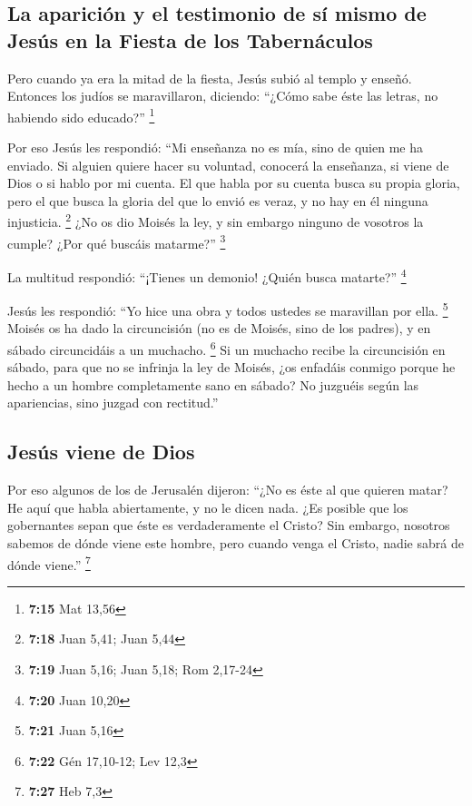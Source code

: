 \hypertarget{la-apariciuxf3n-y-el-testimonio-de-suxed-mismo-de-jesuxfas-en-la-fiesta-de-los-tabernuxe1culos}{%
\subsection{La aparición y el testimonio de sí mismo de Jesús en la
Fiesta de los
Tabernáculos}\label{la-apariciuxf3n-y-el-testimonio-de-suxed-mismo-de-jesuxfas-en-la-fiesta-de-los-tabernuxe1culos}}

 Pero cuando ya era la mitad de la fiesta, Jesús subió al
templo y enseñó.  Entonces los judíos se maravillaron,
diciendo: ``¿Cómo sabe éste las letras, no habiendo sido educado?''
\footnote{\textbf{7:15} Mat 13,56}

 Por eso Jesús les respondió: ``Mi enseñanza no es mía,
sino de quien me ha enviado.  Si alguien quiere hacer su
voluntad, conocerá la enseñanza, si viene de Dios o si hablo por mi
cuenta.  El que habla por su cuenta busca su propia
gloria, pero el que busca la gloria del que lo envió es veraz, y no hay
en él ninguna injusticia. \footnote{\textbf{7:18} Juan 5,41; Juan 5,44}
 ¿No os dio Moisés la ley, y sin embargo ninguno de
vosotros la cumple? ¿Por qué buscáis matarme?'' \footnote{\textbf{7:19}
  Juan 5,16; Juan 5,18; Rom 2,17-24}

 La multitud respondió: ``¡Tienes un demonio! ¿Quién
busca matarte?'' \footnote{\textbf{7:20} Juan 10,20}

 Jesús les respondió: ``Yo hice una obra y todos ustedes
se maravillan por ella. \footnote{\textbf{7:21} Juan 5,16}
 Moisés os ha dado la circuncisión (no es de Moisés, sino
de los padres), y en sábado circuncidáis a un muchacho. \footnote{\textbf{7:22}
  Gén 17,10-12; Lev 12,3}  Si un muchacho recibe la
circuncisión en sábado, para que no se infrinja la ley de Moisés, ¿os
enfadáis conmigo porque he hecho a un hombre completamente sano en
sábado?  No juzguéis según las apariencias, sino juzgad
con rectitud.''

\hypertarget{jesuxfas-viene-de-dios}{%
\subsection{Jesús viene de Dios}\label{jesuxfas-viene-de-dios}}

 Por eso algunos de los de Jerusalén dijeron: ``¿No es
éste al que quieren matar?  He aquí que habla
abiertamente, y no le dicen nada. ¿Es posible que los gobernantes sepan
que éste es verdaderamente el Cristo?  Sin embargo,
nosotros sabemos de dónde viene este hombre, pero cuando venga el
Cristo, nadie sabrá de dónde viene.'' \footnote{\textbf{7:27} Heb 7,3}

